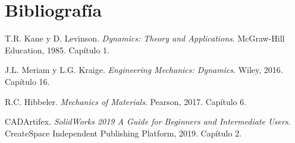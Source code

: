\documentclass{article}
\begin{document}
    \newpage

    \section*{Bibliografía}
    T.R. Kane y D. Levinson. \emph{Dynamics: Theory and Applications}. McGraw-Hill Education, 1985. Capítulo 1.
    
    J.L. Meriam y L.G. Kraige. \emph{Engineering Mechanics: Dynamics}. Wiley, 2016. Capítulo 16.
    
    R.C. Hibbeler. \emph{Mechanics of Materials}. Pearson, 2017. Capítulo 6.
    
    CADArtifex. \emph{SolidWorks 2019 A Guide for Beginners and Intermediate Users}. CreateSpace Independent Publishing Platform, 2019. Capítulo 2.
    
\end{document}
